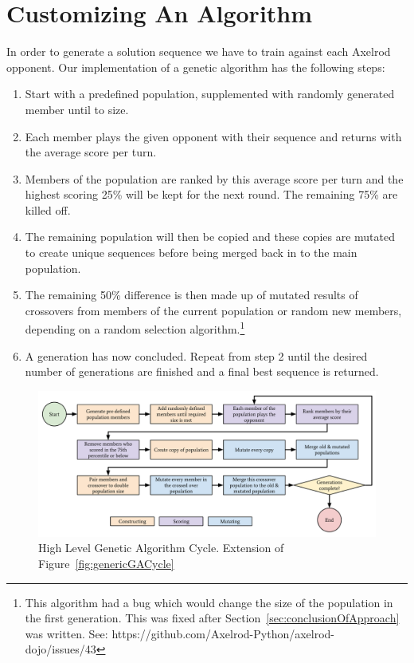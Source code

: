\section{Customizing An Algorithm}\label{sec:buildingTheAlgorithm}
In order to generate a solution sequence we have to train against each Axelrod opponent.
Our implementation of a genetic algorithm has the following steps:
\begin{enumerate}
    \item Start with a predefined population, supplemented with randomly generated member until to size.
    \item Each member plays the given opponent with their sequence and returns with the average score per turn.
    \item Members of the population are ranked by this average score per turn and the highest scoring 25\% will be kept for the next round.
    The remaining 75\% are killed off.
    \item The remaining population will then be copied and these copies are mutated to create unique sequences before being merged back in to the main population.
    \item The remaining 50\% difference is then made up of mutated results of crossovers from members of the current population or random new members, depending on a random selection algorithm.\footnote{This algorithm had a bug which would change the size of the population in the first generation.
    This was fixed after Section~\ref{sec:conclusionOfApproach} was written.
    See: https://github.com/Axelrod-Python/axelrod-dojo/issues/43}
    \item A generation has now concluded.
    Repeat from step 2 until the desired number of generations are finished and a final best sequence is returned.
\end{enumerate}

\begin{figure}[ht]
    \includegraphics[width=1.0\textwidth, center]{./img/flows/custom_ga_cycle}
    \caption{High Level Genetic Algorithm Cycle. Extension of Figure~\ref{fig:genericGACycle}}\label{fig:customGAcycle}
\end{figure}

